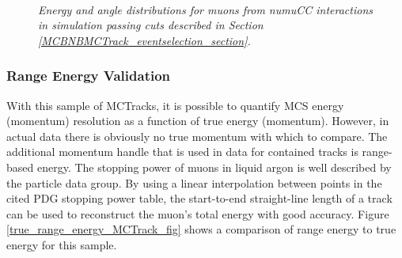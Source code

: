 \begin{figure}
\centering
\mbox{
	\quad
	}
\caption{\textit{Energy and angle distributions for muons from numuCC interactions in {\ub} simulation passing cuts described in Section \ref{MCBNBMCTrack_eventselection_section}.}}
\label{BNBmuon_energy_angle_fig}
\end{figure}



\subsubsection{Range Energy Validation}\label{Range_Energy_Validation_section}
With this sample of {\sc MCTracks}, it is possible to quantify MCS energy (momentum) resolution as a function of true energy (momentum). However, in actual {\ub} data there is obviously no true momentum with which to compare. The additional momentum handle that is used in data for contained tracks is range-based energy. The stopping power of muons in liquid argon is well described by the particle data group\cite{PDG_spline_table}. By using a linear interpolation between points in the cited PDG stopping power table, the start-to-end straight-line length of a track can be used to reconstruct the muon's total energy with good accuracy. Figure \ref{true_range_energy_MCTrack_fig} shows a comparison of range energy to true energy for this sample. \\

